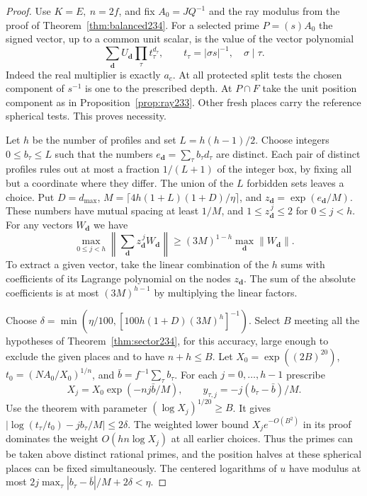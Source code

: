 \documentclass[a4paper,11pt]{article}
\theoremstyle{definition}
\theoremstyle{remark}
\numberwithin{equation}{section}
\begin{document}
\begin{proof}
Use \(K=E,\ n=2f\), and fix \(A_0=JQ^{-1}\) and the ray modulus
from the proof of Theorem~\ref{thm:balanced234}. For a selected
prime \(P=(s)A_0\) the signed vector, up to a common unit scalar,
is the value of the vector polynomial
\[
   \sum_{\mathbf d}U_{\mathbf d}\prod_\tau t_\tau^{d_\tau},
              \qquad t_\tau=|\sigma s|^{-1},\quad \sigma\mid\tau .
\]
Indeed the real multiplier is exactly \(a_c\). At all protected
split tests the chosen component of \(s^{-1}\) is one to the
prescribed depth. At \(P\cap F\) take the unit position component
as in Proposition~\ref{prop:ray233}. Other fresh places carry the
reference spherical tests. This proves necessity.

Let \(h\) be the number of profiles and set \(L=h(h-1)/2\).
Choose integers \(0\le b_\tau\le L\) such that the numbers
\(e_{\mathbf d}=\sum_\tau b_\tau d_\tau\) are distinct. Each pair
of distinct profiles rules out at most a fraction \(1/(L+1)\)
of the integer box, by fixing all but a coordinate where they
differ. The union of the \(L\) forbidden sets leaves a choice.
Put \(D=d_{\max}\), \(M=\lceil4h(1+L)(1+D)/\eta\rceil\), and
\(z_{\mathbf d}=\exp(e_{\mathbf d}/M)\). These numbers have
mutual spacing at least \(1/M\), and \(1\le z_{\mathbf d}^{\,j}
\le2\) for \(0\le j<h\). For any vectors \(W_{\mathbf d}\) we have
\[
   \max_{0\le j<h}\left\|\sum_{\mathbf d}z_{\mathbf d}^{\,j}
            W_{\mathbf d}\right\|
    \ge (3M)^{1-h}\max_{\mathbf d}\|W_{\mathbf d}\| .
\]
To extract a given vector, take the linear combination of the
\(h\) sums with coefficients of its Lagrange polynomial on the
nodes \(z_{\mathbf d}\). The sum of the absolute coefficients is
at most \((3M)^{h-1}\) by multiplying the linear factors.

Choose \(\delta=\min(\eta/100,[100h(1+D)(3M)^h]^{-1})\).
Select \(B\) meeting all the hypotheses of Theorem~\ref{thm:sector234}, for this accuracy, large enough to
exclude the given places and to have \(n+h\le B\).
Let \(X_0=\exp((2B)^{20})\), \(t_0=(NA_0/X_0)^{1/n}\), and
\(\bar b=f^{-1}\sum_\tau b_\tau\). For each \(j=0,\ldots,h-1\)
prescribe
\[
   X_j=X_0\exp(-n j\bar b/M),\qquad
   y_{\tau,j}=-j(b_\tau-\bar b)/M .
\]
Use the theorem with parameter \((\log X_j)^{1/20}\ge B\).
It gives \(|\log(t_\tau/t_0)-j b_\tau/M|\le2\delta\).
The weighted lower bound \(X_j e^{-O(B^2)}\) in its proof dominates
the weight \(O(hn\log X_j)\) at all earlier choices. Thus the
primes can be taken above distinct rational primes, and the
position halves at these spherical places can be fixed simultaneously.
The centered logarithms of \(u\) have modulus at most
\(2j\max_\tau|b_\tau-\bar b|/M+2\delta<\eta\).


\end{proof}
\end{document}
